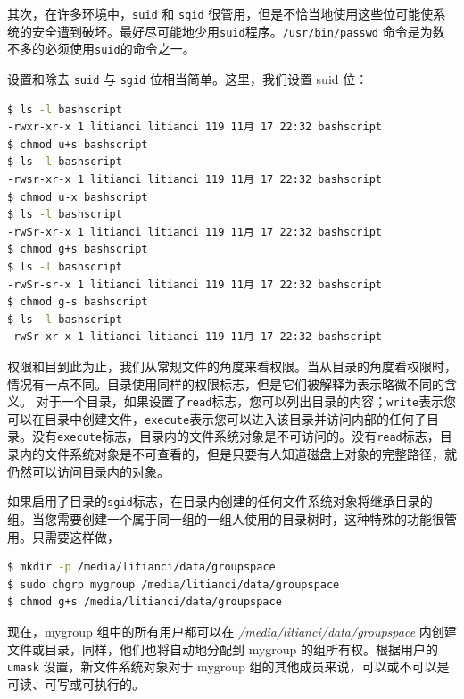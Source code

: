 \documentclass[doctor,openright,twoside]{sjtuthesis}
\newcommand{\passthrough}[1]{#1}
\theoremstyle{plain}
\theoremstyle{definition}
\theoremstyle{remark}
\theoremstyle{ocrenumbox}
\theoremstyle{plain}
\begin{document}
其次，在许多环境中，\passthrough{\lstinline!suid!} 和
\passthrough{\lstinline!sgid!}
很管用，但是不恰当地使用这些位可能使系统的安全遭到破坏。最好尽可能地少用\passthrough{\lstinline!suid!}程序。\passthrough{\lstinline!/usr/bin/passwd!}
命令是为数不多的必须使用\passthrough{\lstinline!suid!}的命令之一。

设置和除去 \passthrough{\lstinline!suid!} 与
\passthrough{\lstinline!sgid!} 位相当简单。这里，我们设置 suid 位：

\begin{lstlisting}[language=bash]
$ ls -l bashscript 
-rwxr-xr-x 1 litianci litianci 119 11月 17 22:32 bashscript
$ chmod u+s bashscript 
$ ls -l bashscript 
-rwsr-xr-x 1 litianci litianci 119 11月 17 22:32 bashscript
$ chmod u-x bashscript 
$ ls -l bashscript 
-rwSr-xr-x 1 litianci litianci 119 11月 17 22:32 bashscript
$ chmod g+s bashscript 
$ ls -l bashscript 
-rwSr-sr-x 1 litianci litianci 119 11月 17 22:32 bashscript
$ chmod g-s bashscript 
$ ls -l bashscript 
-rwSr-xr-x 1 litianci litianci 119 11月 17 22:32 bashscript
\end{lstlisting}

权限和目到此为止，我们从常规文件的角度来看权限。当从目录的角度看权限时，情况有一点不同。目录使用同样的权限标志，但是它们被解释为表示略微不同的含义。
对于一个目录，如果设置了\passthrough{\lstinline!read!}标志，您可以列出目录的内容；\passthrough{\lstinline!write!}表示您可以在目录中创建文件，\passthrough{\lstinline!execute!}表示您可以进入该目录并访问内部的任何子目录。没有\passthrough{\lstinline!execute!}标志，目录内的文件系统对象是不可访问的。没有\passthrough{\lstinline!read!}标志，目录内的文件系统对象是不可查看的，但是只要有人知道磁盘上对象的完整路径，就仍然可以访问目录内的对象。

如果启用了目录的\passthrough{\lstinline!sgid!}标志，在目录内创建的任何文件系统对象将继承目录的组。当您需要创建一个属于同一组的一组人使用的目录树时，这种特殊的功能很管用。只需要这样做，

\begin{lstlisting}[language=bash]
$ mkdir -p /media/litianci/data/groupspace
$ sudo chgrp mygroup /media/litianci/data/groupspace
$ chmod g+s /media/litianci/data/groupspace
\end{lstlisting}

现在，mygroup 组中的所有用户都可以在
\emph{/media/litianci/data/groupspace}
内创建文件或目录，同样，他们也将自动地分配到 mygroup
的组所有权。根据用户的 \passthrough{\lstinline!umask!}
设置，新文件系统对象对于 mygroup
组的其他成员来说，可以或不可以是可读、可写或可执行的。
\end{document}
